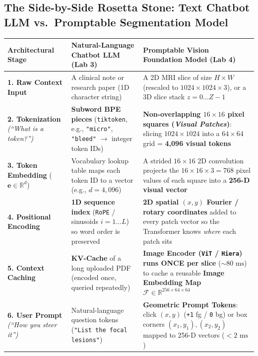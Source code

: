 \documentclass[10.5pt,a4paper]{article}
\begin{document}
\subsection{The Side-by-Side Rosetta Stone: Text Chatbot LLM vs.\ Promptable Segmentation Model}

\begin{table}[!ht]
\centering
\footnotesize
\renewcommand{\arraystretch}{1.22}
\begin{tabularx}{\textwidth}{L{3.1cm} Y Y}
\toprule
{}
\textbf{Architectural Stage} & \textbf{Natural-Language Chatbot LLM (Lab 3)} & \textbf{Promptable Vision Foundation Model (Lab 4)} \\
\midrule
\textbf{1. Raw Context Input} & A clinical note or research paper (1D character string) & A 2D MRI slice of size $H \times W$ (rescaled to $1024 \times 1024 \times 3$), or a 3D slice stack $z = 0 \dots Z-1$ \\
\textbf{2. Tokenization} \newline \emph{(``What is a token?'')} & \textbf{Subword BPE pieces} (\texttt{tiktoken}, e.g., \texttt{"micro"}, \texttt{"bleed"} $\to$ integer token IDs) & \textbf{Non-overlapping $16 \times 16$ pixel squares (\emph{Visual Patches})}: slicing $1024 \times 1024$ into a $64 \times 64$ grid = \textbf{4,096 visual tokens} \\
\textbf{3. Token Embedding} ($\mathbf{e} \in \mathbb{R}^d$) & Vocabulary lookup table maps each token ID to a vector (e.g., $d = 4{,}096$) & A strided $16 \times 16$ 2D convolution projects the $16 \times 16 \times 3 = 768$ pixel values of each square into a \textbf{256-D visual vector} \\
\textbf{4. Positional Encoding} & \textbf{1D sequence index} (\texttt{RoPE} / sinusoids $i = 1 \dots L$) so word order is preserved & \textbf{2D spatial $(x, y)$ Fourier / rotary coordinates} added to every patch vector so the Transformer knows \emph{where} each patch sits \\
\textbf{5. Context Caching} & \textbf{KV-Cache} of a long uploaded PDF (encoded once, queried repeatedly) & \textbf{Image Encoder (\texttt{ViT} / \texttt{Hiera}) runs ONCE per slice} ($\sim 80\text{ ms}$) to cache a reusable \textbf{Image Embedding Map} $\mathcal{F} \in \mathbb{R}^{256 \times 64 \times 64}$ \\
\textbf{6. User Prompt} \newline \emph{(``How you steer it'')} & Natural-language question tokens (\texttt{"List the focal lesions"}) & \textbf{Geometric Prompt Tokens}: click $(x, y)$ (\texttt{+1} fg / \texttt{0} bg) or box corners $(x_1, y_1), (x_2, y_2)$ mapped to 256-D vectors ($< 2\text{ ms}$) \\

\end{tabularx}
\end{table}
\end{document}
